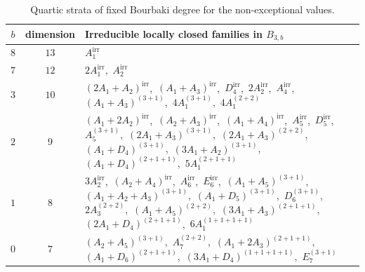 \documentclass[11pt]{amsart} %
\theoremstyle{definition}
\begin{document}
\begin{table}[ht]
\caption{Quartic strata of fixed Bourbaki degree for the non-exceptional values.}
\centering
\renewcommand{\arraystretch}{1.15}
{\small
\begin{tabular}{c|c|p{9.5cm}}
\hline
$b$ & dimension & Irreducible locally closed families in $B_{3,b}$ \\
\hline
$8$ & $13$ &
$A_1^{\mathrm{irr}}$ \\[0.4ex]
\hline
$7$ & $12$ &
$2A_1^{\mathrm{irr}}$,\ $A_2^{\mathrm{irr}}$ \\[0.4ex]
\hline
$3$ & $10$ &
$(2A_1+A_2)^{\mathrm{irr}}$,\ $(A_1+A_3)^{\mathrm{irr}}$,\ $D_4^{\mathrm{irr}}$,\ $2A_2^{\mathrm{irr}}$,\ $A_4^{\mathrm{irr}}$,\ $(A_1+A_3)^{(3+1)}$,\ $4A_1^{(3+1)}$,\ $4A_1^{(2+2)}$ \\[0.4ex]
\hline
$2$ & $9$ &
$(A_1+2A_2)^{\mathrm{irr}}$,\ $(A_2+A_3)^{\mathrm{irr}}$,\ $(A_1+A_4)^{\mathrm{irr}}$,\ $A_5^{\mathrm{irr}}$,\ $D_5^{\mathrm{irr}}$,\ $A_5^{(3+1)}$,\ $(2A_1+A_3)^{(3+1)}$,\ $(2A_1+A_3)^{(2+2)}$,\ $(A_1+D_4)^{(3+1)}$,\ $(3A_1+A_2)^{(3+1)}$,\ $(A_1+D_4)^{(2+1+1)}$,\ $5A_1^{(2+1+1)}$ \\[0.4ex]
\hline
$1$ & $8$ &
$3A_2^{\mathrm{irr}}$,\ $(A_2+A_4)^{\mathrm{irr}}$,\ $A_6^{\mathrm{irr}}$,\ $E_6^{\mathrm{irr}}$,\ $(A_1+A_5)^{(3+1)}$,\ $(A_1+A_2+A_3)^{(3+1)}$,\ $(A_1+D_5)^{(3+1)}$,\ $D_6^{(3+1)}$,\ $2A_3^{(2+2)}$,\ $(A_1+A_5)^{(2+2)}$,\ $(3A_1+A_3)^{(2+1+1)}$,\ $(2A_1+D_4)^{(2+1+1)}$,\ $6A_1^{(1+1+1+1)}$ \\[0.4ex]
\hline
$0$ & $7$ &
$(A_2+A_5)^{(3+1)}$,\ $A_7^{(2+2)}$,\ $(A_1+2A_3)^{(2+1+1)}$,\ $(A_1+D_6)^{(2+1+1)}$,\ $(3A_1+D_4)^{(1+1+1+1)}$,\ $E_7^{(3+1)}$ \\[0.4ex]
\hline
\end{tabular}}
\label{tab:quartic-Bour-strata}
\end{table}
\end{document}
